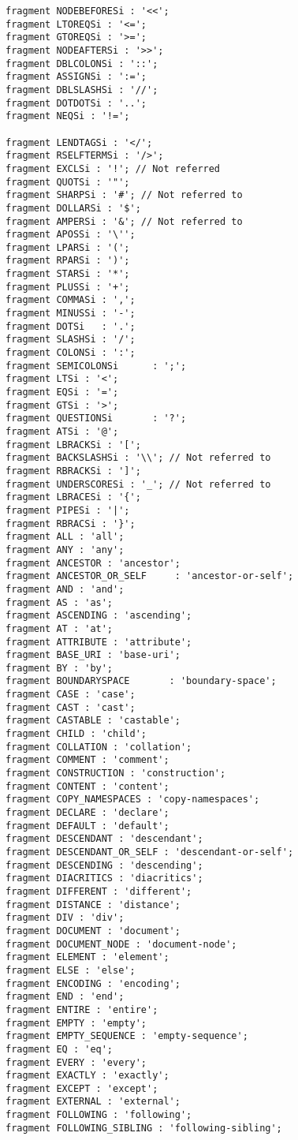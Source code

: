 \begin{Verbatim}[frame=none, fontsize=\footnotesize]
fragment NODEBEFORESi : '<<';
fragment LTOREQSi : '<=';
fragment GTOREQSi : '>=';
fragment NODEAFTERSi : '>>';
fragment DBLCOLONSi : '::';
fragment ASSIGNSi : ':=';
fragment DBLSLASHSi : '//';
fragment DOTDOTSi : '..';
fragment NEQSi : '!=';

fragment LENDTAGSi : '</'; 
fragment RSELFTERMSi : '/>';
fragment EXCLSi : '!'; // Not referred
fragment QUOTSi : '"';
fragment SHARPSi : '#'; // Not referred to
fragment DOLLARSi : '$';
fragment AMPERSi : '&'; // Not referred to
fragment APOSSi : '\'';
fragment LPARSi : '(';
fragment RPARSi : ')';
fragment STARSi : '*';
fragment PLUSSi : '+';
fragment COMMASi : ',';
fragment MINUSSi : '-';
fragment DOTSi   : '.';
fragment SLASHSi : '/';
fragment COLONSi : ':';
fragment SEMICOLONSi      : ';';
fragment LTSi : '<';
fragment EQSi : '=';
fragment GTSi : '>';
fragment QUESTIONSi       : '?';
fragment ATSi : '@';
fragment LBRACKSi : '[';
fragment BACKSLASHSi : '\\'; // Not referred to
fragment RBRACKSi : ']';
fragment UNDERSCORESi : '_'; // Not referred to
fragment LBRACESi : '{';
fragment PIPESi : '|';
fragment RBRACSi : '}';
fragment ALL : 'all';
fragment ANY : 'any';
fragment ANCESTOR : 'ancestor';
fragment ANCESTOR_OR_SELF     : 'ancestor-or-self';
fragment AND : 'and';
fragment AS : 'as';
fragment ASCENDING : 'ascending';
fragment AT : 'at';
fragment ATTRIBUTE : 'attribute';
fragment BASE_URI : 'base-uri';
fragment BY : 'by';
fragment BOUNDARYSPACE       : 'boundary-space';
fragment CASE : 'case';
fragment CAST : 'cast';
fragment CASTABLE : 'castable';
fragment CHILD : 'child';
fragment COLLATION : 'collation';
fragment COMMENT : 'comment';
fragment CONSTRUCTION : 'construction';
fragment CONTENT : 'content';
fragment COPY_NAMESPACES : 'copy-namespaces';
fragment DECLARE : 'declare';
fragment DEFAULT : 'default';
fragment DESCENDANT : 'descendant';
fragment DESCENDANT_OR_SELF : 'descendant-or-self';
fragment DESCENDING : 'descending';
fragment DIACRITICS : 'diacritics';
fragment DIFFERENT : 'different';
fragment DISTANCE : 'distance';
fragment DIV : 'div';
fragment DOCUMENT : 'document';
fragment DOCUMENT_NODE : 'document-node';
fragment ELEMENT : 'element';
fragment ELSE : 'else';
fragment ENCODING : 'encoding';
fragment END : 'end';
fragment ENTIRE : 'entire';
fragment EMPTY : 'empty';
fragment EMPTY_SEQUENCE : 'empty-sequence';
fragment EQ : 'eq';
fragment EVERY : 'every';
fragment EXACTLY : 'exactly';
fragment EXCEPT : 'except';
fragment EXTERNAL : 'external';
fragment FOLLOWING : 'following';
fragment FOLLOWING_SIBLING : 'following-sibling';

\end{Verbatim}

